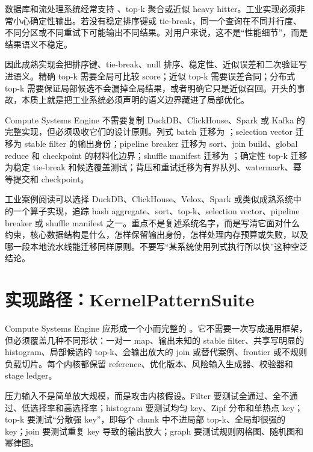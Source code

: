 数据库和流处理系统经常支持 、top-k 聚合或近似 heavy hitter。工业实现必须非常小心确定性输出。若没有稳定排序键或 tie-break，同一个查询在不同并行度、不同分区或不同重试下可能输出不同结果。对用户来说，这不是“性能细节”，而是结果语义不稳定。

因此成熟实现会把排序键、tie-break、null 排序、稳定性、近似误差和二次验证写进语义。精确 top-k 需要全局可比较 score；近似 top-k 需要误差合同；分布式 top-k 需要保证局部候选不会漏掉全局结果，或者明确它只是近似召回。开头的事故，本质上就是把工业系统必须声明的语义边界藏进了局部优化。

Compute Systems Engine 不需要复制 DuckDB、ClickHouse、Spark 或 Kafka 的完整实现，但必须吸收它们的设计原则。列式 batch 迁移为 ；selection vector 迁移为 stable filter 的输出身份；pipeline breaker 迁移为 sort、join build、global reduce 和 checkpoint 的材料化边界；shuffle manifest 迁移为 ；确定性 top-k 迁移为稳定 tie-break 和候选覆盖测试；背压和重试迁移为有界队列、watermark、幂等提交和 checkpoint。

\begin{sourcereadingbox}
工业案例阅读可以选择 DuckDB、ClickHouse、Velox、Spark 或类似成熟系统中的一个算子实现，追踪 hash aggregate、sort、top-k、selection vector、pipeline breaker 或 shuffle manifest 之一。重点不是复述系统名字，而是写清它面对什么约束，核心数据结构是什么，怎样保留输出身份，怎样处理内存预算或失败，以及哪一段本地流水线能迁移同样原则。不要写“某系统使用列式执行所以快”这种空泛结论。
\end{sourcereadingbox}

\section{实现路径：KernelPatternSuite}

Compute Systems Engine 应形成一个小而完整的 。它不需要一次写成通用框架，但必须覆盖几种不同形状：一对一 map、输出未知的 stable filter、共享写明显的 histogram、局部候选的 top-k、会输出放大的 join 或替代案例、frontier 或不规则负载切片。每个内核都保留 reference、优化版本、风险输入生成器、校验器和 stage ledger。

压力输入不是简单放大规模，而是攻击内核假设。Filter 要测试全通过、全不通过、低选择率和高选择率；histogram 要测试均匀 key、Zipf 分布和单热点 key；top-k 要测试“分散强 key”，即每个 chunk 中不进局部 top-k、全局却很强的 key；join 要测试重复 key 导致的输出放大；graph 要测试规则网格图、随机图和幂律图。

